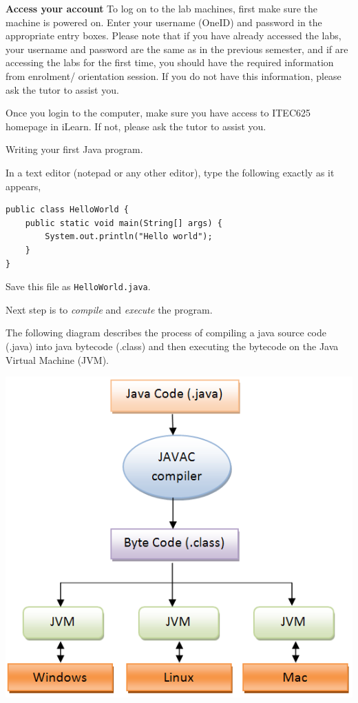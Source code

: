 \vspace{1em}
\begin{questions}
\question  \textbf{Access your account} \vskip 0.5cm
To log on to the lab machines, first make sure the machine is powered on. 
Enter your username (OneID) and password in the appropriate entry boxes. 
Please note that if you have already accessed the labs, your username and password are the same as in the previous semester, and if are accessing the labs for the first time, you should have the required information from enrolment/ orientation session. If you do not have this information, please ask the tutor to assist you.

Once you login to the computer, make sure you have access to ITEC625 homepage in iLearn. If not, please ask the tutor to assist you.

\newpage

\question Writing your first Java program.

In a text editor (notepad or any other editor), type the following exactly as it appears,

\begin{verbatim}
public class HelloWorld {
	public static void main(String[] args) {
		System.out.println("Hello world");
	}
}
\end{verbatim}

Save this file as \texttt{HelloWorld.java}.

Next step is to \emph{compile} and \emph{execute} the program.

The following diagram describes the process of compiling a java source code (.java) into java bytecode (.class) and then executing the bytecode on the Java Virtual Machine (JVM).
\vskip 0.5cm
\begin{center}
	\includegraphics[scale=0.3]{javaCompileExecute}
\end{center}
\vskip 0.5cm


\end{questions}
